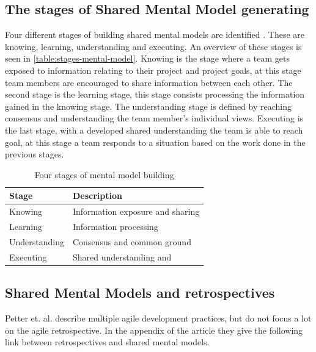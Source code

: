 \subsection{The stages of Shared Mental Model generating}

\label{section:mental-models-stages}
	
Four different stages of building shared mental models are identified \cite{Petter2013}. These are knowing, learning, understanding and executing. An overview of these stages is seen in  \autoref{table:stages-mental-model}. Knowing is the stage where a team gets exposed to information relating to their project and project goals, at this stage team members are encouraged to share information between each other. The second stage is the learning stage, this stage consists processing the information gained in the knowing stage. The understanding stage is defined by reaching consensus and understanding the team member's individual views. Executing is the last stage, with a developed shared understanding the team is able to reach goal, at this stage a team responds to a situation based on the work done in the previous stages.

\begin{table}[!h]
	\begin{centering}
	\caption{Four stages of mental model building}
	\label{table:stages-mental-model}
	\begin{tabular}{l | p{}}

	\hline
	Stage & Description \\
	\hline
	Knowing &  Information exposure and sharing\\
	Learning & Information processing \\
	Understanding & Consensus and common ground \\
	Executing & Shared understanding and  \\
	\hline
	
\end{tabular}
\end{centering}
\end{table}

	
\subsection{Shared Mental Models and retrospectives}

Petter et. al. \cite{Petter2013} describe multiple agile development practices, but do not focus a lot on the agile retrospective. In the appendix of the article they give the following link between retrospectives and shared mental models.

